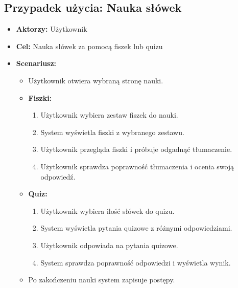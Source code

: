\subsection{Przypadek użycia: Nauka słówek}
\begin{itemize}
    \item \textbf{Aktorzy:} Użytkownik
    \item \textbf{Cel:} Nauka słówek za pomocą fiszek lub quizu
    \item \textbf{Scenariusz:}
          \begin{itemize}
              \item Użytkownik otwiera wybraną stronę nauki.
              \item \textbf{Fiszki:}
                    \begin{enumerate}
                        \item Użytkownik wybiera zestaw fiszek do nauki.
                        \item System wyświetla fiszki z wybranego zestawu.
                        \item Użytkownik przegląda fiszki i próbuje odgadnąć tłumaczenie.
                        \item Użytkownik sprawdza poprawność tłumaczenia i ocenia swoją odpowiedź.
                    \end{enumerate}
              \item \textbf{Quiz:}
                    \begin{enumerate}
                        \item Użytkownik wybiera ilość słówek do quizu.
                        \item System wyświetla pytania quizowe z różnymi odpowiedziami.
                        \item Użytkownik odpowiada na pytania quizowe.
                        \item System sprawdza poprawność odpowiedzi i wyświetla wynik.
                    \end{enumerate}
              \item Po zakończeniu nauki system zapisuje postępy.
          \end{itemize}
\end{itemize}

